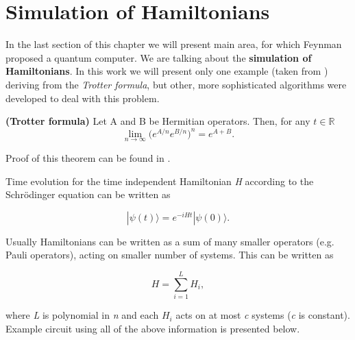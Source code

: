 \section{Simulation of Hamiltonians}

In the last section of this chapter we will present main area, for which Feynman proposed a quantum computer. We are talking about the \textbf{simulation of Hamiltonians}. In this work we will present only one example (taken from \cite{nielsen_chuang}) deriving from the \textit{Trotter formula}, but other, more sophisticated algorithms were developed to deal with this problem.

\begin{theorem}
\textbf{(Trotter formula)} Let A and B be Hermitian operators. Then, for any $t \in \mathbb{R}$
\[ \lim_{n\to\infty} \Big( e^{A/n}e^{B/n} \Big)^n = e^{A + B}.\]
\end{theorem}

Proof of this theorem can be found in \cite{nielsen_chuang}.

Time evolution for the time independent Hamiltonian \textit{H} according to the Schr\"odinger equation can be written as

\[ |\psi(t)\rangle = e^{-iHt}|\psi(0)\rangle.\]

Usually Hamiltonians can be written as a sum of many smaller operators (e.g. Pauli operators), acting on smaller number of systems. This can be written as 

\[ H = \sum_{i = 1}^{L}H_i,\]

where \textit{L} is polynomial in \textit{n} and each $H_i$ acts on at most \textit{c} systems (\textit{c} is constant). Example circuit using all of the above information is presented below.

